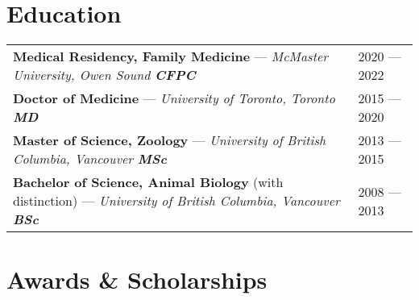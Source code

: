 \documentclass[a4paper,10pt,oneside,onecolumn,draft]{article} %
\renewcommand\arraystretch{1.2}
\begin{document}
\renewcommand\arraystretch{1.1}  %
\section*{Education}
\begin{tabular*}{1\textwidth}{Z!{\SubVRule}z}
  {\bfseries Medical Residency, Family Medicine}{ --- \slshape McMaster University, Owen Sound \hfill \normalfont{} \bfseries CFPC\/}&2020 --- 2022\\
  {\bfseries Doctor of Medicine}{ --- \slshape University of Toronto, Toronto \hfill \normalfont{} \bfseries MD\/}&2015 --- 2020\\
  {\bfseries Master of Science, Zoology}{ --- \slshape University of British Columbia, Vancouver \hfill \normalfont{} \bfseries MSc\/}&2013 --- 2015\\
  {\bfseries Bachelor of Science, Animal Biology }{\small (with distinction)}{ --- \normalsize\slshape University of British Columbia, Vancouver \hfill \normalfont{} \bfseries BSc\/}&2008 --- 2013\\
\end{tabular*}%
\renewcommand\arraystretch{1.2} %

\section*{Awards \& Scholarships}
\end{document}

